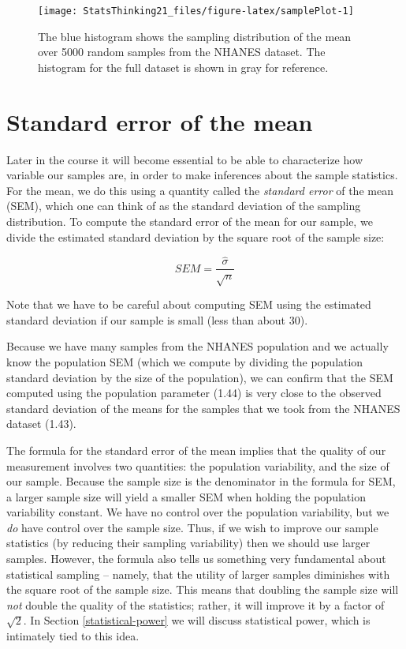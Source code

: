 \documentclass[12pt,]{book}
\theoremstyle{definition}
\theoremstyle{definition}
\theoremstyle{definition}
\theoremstyle{remark}
\begin{document}
\begin{figure}
\texttt{[image: StatsThinking21\_files/figure-latex/samplePlot-1]} \caption{The blue histogram shows the sampling distribution of the mean over 5000 random samples from the NHANES dataset.  The histogram for the full dataset is shown in gray for reference.}\label{fig:samplePlot}
\end{figure}

\hypertarget{standard-error-of-the-mean}{%
\section{Standard error of the mean}\label{standard-error-of-the-mean}}

Later in the course it will become essential to be able to characterize how variable our samples are, in order to make inferences about the sample statistics. For the mean, we do this using a quantity called the \emph{standard error} of the mean (SEM), which one can think of as the standard deviation of the sampling distribution. To compute the standard error of the mean for our sample, we divide the estimated standard deviation by the square root of the sample size:

\[
SEM = \frac{\hat{\sigma}}{\sqrt{n}}
\]

Note that we have to be careful about computing SEM using the estimated standard deviation if our sample is small (less than about 30).

Because we have many samples from the NHANES population and we actually know the population SEM (which we compute by dividing the population standard deviation by the size of the population), we can confirm that the SEM computed using the population parameter (1.44) is very close to the observed standard deviation of the means for the samples that we took from the NHANES dataset (1.43).

The formula for the standard error of the mean implies that the quality of our measurement involves two quantities: the population variability, and the size of our sample. Because the sample size is the denominator in the formula for SEM, a larger sample size will yield a smaller SEM when holding the population variability constant. We have no control over the population variability, but we \emph{do} have control over the sample size. Thus, if we wish to improve our sample statistics (by reducing their sampling variability) then we should use larger samples. However, the formula also tells us something very fundamental about statistical sampling -- namely, that the utility of larger samples diminishes with the square root of the sample size. This means that doubling the sample size will \emph{not} double the quality of the statistics; rather, it will improve it by a factor of \(\sqrt{2}\). In Section \ref{statistical-power} we will discuss statistical power, which is intimately tied to this idea.
\end{document}
